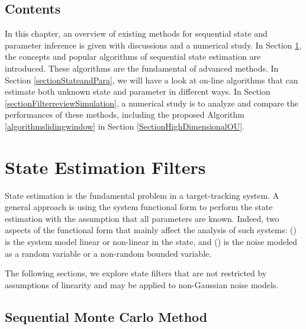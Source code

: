 \subsection*{Contents}

In this chapter, an overview of existing methods for sequential state and parameter inference is given with discussions and a numerical study. In Section \ref{sectionFiltering}, the concepts and popular algorithms of sequential state estimation are introduced. These algorithms are the fundamental of advanced methods. In Section \ref{sectionStateandPara}, we will have a look at on-line algorithms that can estimate both unknown state and parameter in different ways. In Section \ref{sectionFilterreviewSimulation}, a numerical study is to analyze and compare the performances of these methods, including the proposed Algorithm \ref{algorithmslidingwindow} in Section \ref{SectionHighDimensionalOU}. 




\section{State Estimation Filters}\label{sectionFiltering}

State estimation is the fundamental problem in a target-tracking system. A general approach is using the system functional form to perform the state estimation with the assumption that all parameters are known. Indeed, two aspects of the functional form that mainly affect the analysis of such systems: () is the system model linear or non-linear in the state, and () is the noise modeled as a random variable or a non-random bounded variable.

The following sections, we explore state filters that are not restricted by assumptions of linearity and may be applied to non-Gaussian noise models.  


\subsection{Sequential Monte Carlo Method}

